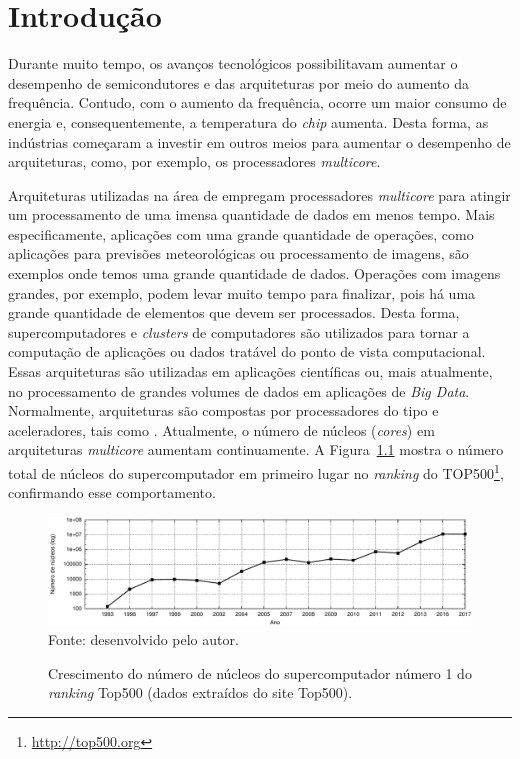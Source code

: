 \chapter{Introdução}
\label{cha:introducao}

Durante muito tempo, os avanços tecnológicos possibilitavam aumentar o
desempenho de semicondutores e das arquiteturas por meio do aumento da
frequência. Contudo, com o aumento da frequência, ocorre um maior consumo de
energia e, consequentemente, a temperatura do \textit{chip} aumenta. Desta
forma, as indústrias começaram a investir em outros meios para aumentar o
desempenho de arquiteturas, como, por exemplo, os processadores \textit{multicore}.

Arquiteturas utilizadas na área de \hpc empregam processadores \textit{multicore} para atingir um
processamento de uma imensa quantidade de dados em menos tempo. Mais especificamente,
aplicações com uma grande quantidade de operações, como aplicações para
previsões meteorológicas ou processamento de imagens, são exemplos onde temos
uma grande quantidade de dados. Operações com imagens grandes, por exemplo,
podem levar muito tempo para finalizar, pois há uma grande quantidade de
elementos que devem ser processados. Desta forma, supercomputadores e
\textit{clusters} de computadores são utilizados para tornar a computação de
aplicações ou dados tratável do ponto de vista computacional. Essas arquiteturas
são utilizadas em aplicações científicas ou, mais atualmente, no processamento
de grandes volumes de dados em aplicações de \textit{Big Data}. Normalmente, arquiteturas
\hpc são compostas por processadores do tipo \cpu{} e aceleradores, tais como \gpu.
Atualmente, o número de núcleos (\textit{cores}) em arquiteturas \textit{multicore}
aumentam continuamente. A Figura~\ref{fig:graphCores} mostra o número total de
núcleos do supercomputador em primeiro lugar no \textit{ranking} do
TOP500\footnote{\url{http://top500.org}}, confirmando esse comportamento.


\begin{figure}[t]
	\centering
	\caption{Crescimento do número de núcleos do supercomputador número 1 do
        \textit{ranking} Top500 (dados extraídos do site Top500).}
	\includegraphics[width=\textwidth]{figs/top500.pdf} \\
    Fonte: desenvolvido pelo autor.
	\label{fig:graphCores}
\end{figure}

